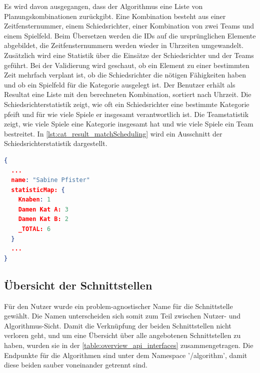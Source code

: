 Es wird davon ausgegangen, dass der Algorithmus eine Liste von Planungskombinationen zurückgibt. Eine Kombination besteht aus einer Zeitfensternummer, einem Schiedsrichter, 
einer Kombination von zwei Teams und einem Spielfeld. Beim Übersetzen werden die IDs auf die ursprünglichen Elemente abgebildet, die Zeitfensternummern werden wieder in Uhrzeiten 
umgewandelt. Zusätzlich wird eine Statistik über die Einsätze der Schiedsrichter und der Teams geführt. Bei der Validierung wird geschaut, ob ein Element zu einer 
bestimmten Zeit mehrfach verplant ist, ob die Schiedsrichter die nötigen Fähigkeiten haben und ob ein Spielfeld für die Kategorie ausgelegt ist. Der Benutzer erhält als Resultat eine Liste 
mit den berechneten Kombination, sortiert nach Uhrzeit. Die Schiedsrichterstatistik zeigt, wie oft ein Schiedsrichter eine bestimmte Kategorie pfeift und für wie viele Spiele er insgesamt 
verantwortlich ist. Die Teamstatistik zeigt, wie viele Spiele eine Kategorie insgesamt hat und wie viele Spiele ein Team bestreitet. In \autoref{lst:cat_result_matchScheduling} wird ein 
Ausschnitt der Schiedsrichterstatistik dargestellt.

\begin{lstlisting}[language=JSON, caption=Ausschnitt eines Resultats einer Spielplan Erstellung, label=lst:cat_result_matchScheduling]  
{
  ...
  name: "Sabine Pfister"
  statisticMap: {
    Knaben: 1
    Damen Kat A: 3
    Damen Kat B: 2
    _TOTAL: 6
  }
  ...
}
\end{lstlisting}

\subsection{Übersicht der Schnittstellen}
Für den Nutzer wurde ein problem-agnostischer Name für die Schnittstelle gewählt. Die Namen unterscheiden sich somit zum Teil zwischen Nutzer- und Algorithmus-Sicht. Damit die 
Verknüpfung der beiden Schnittstellen nicht verloren geht, und um eine Übersicht über alle angebotenen Schnittstellen zu haben, wurden sie in der \autoref{table:overview_api_interfaces} 
zusammengetragen. Die Endpunkte für die Algorithmen sind unter dem Namespace '/algorithm', damit diese beiden sauber voneinander getrennt sind.

